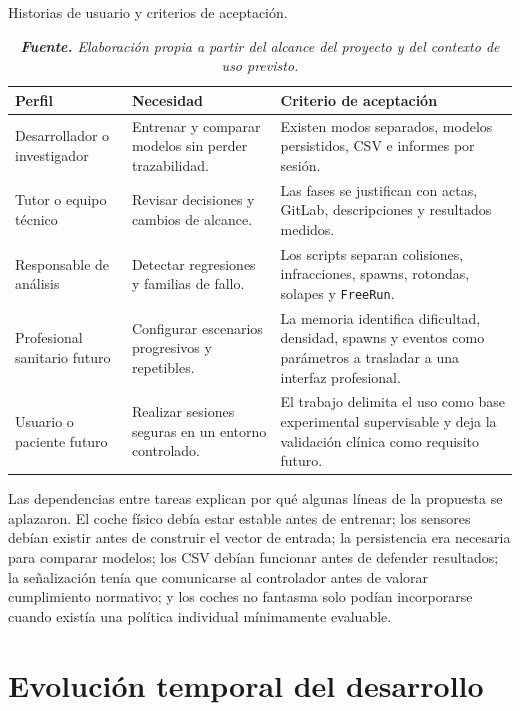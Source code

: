 \begin{table}[htbp]
\centering
\caption{Historias de usuario y criterios de aceptación.}%
\label{tab:historias-usuario}
\begin{tabularx}{0.96\textwidth}{L{3.2cm}>{\raggedright\arraybackslash}X>{\raggedright\arraybackslash}X}
\toprule
\textbf{Perfil} & \textbf{Necesidad} & \textbf{Criterio de aceptación}\\
\midrule
Desarrollador o investigador & Entrenar y comparar modelos sin perder trazabilidad. & Existen modos separados, modelos persistidos, CSV e informes por sesión.\\
Tutor o equipo técnico & Revisar decisiones y cambios de alcance. & Las fases se justifican con actas, GitLab, descripciones y resultados medidos.\\
Responsable de análisis & Detectar regresiones y familias de fallo. & Los scripts separan colisiones, infracciones, spawns, rotondas, solapes y \texttt{FreeRun}.\\
Profesional sanitario futuro & Configurar escenarios progresivos y repetibles. & La memoria identifica dificultad, densidad, spawns y eventos como parámetros a trasladar a una interfaz profesional.\\
Usuario o paciente futuro & Realizar sesiones seguras en un entorno controlado. & El trabajo delimita el uso como base experimental supervisable y deja la validación clínica como requisito futuro.\\
\bottomrule
\end{tabularx}
\caption*{\textit{\textbf{Fuente.} Elaboración propia a partir del alcance del proyecto y del contexto de uso previsto.}}
\end{table}

Las dependencias entre tareas explican por qué algunas líneas de la propuesta se aplazaron. El coche físico debía estar estable antes de entrenar; los sensores debían existir antes de construir el vector de entrada; la persistencia era necesaria para comparar modelos; los CSV debían funcionar antes de defender resultados; la señalización tenía que comunicarse al controlador antes de valorar cumplimiento normativo; y los coches no fantasma solo podían incorporarse cuando existía una política individual mínimamente evaluable.

\clearpage
\section{Evolución temporal del desarrollo}

